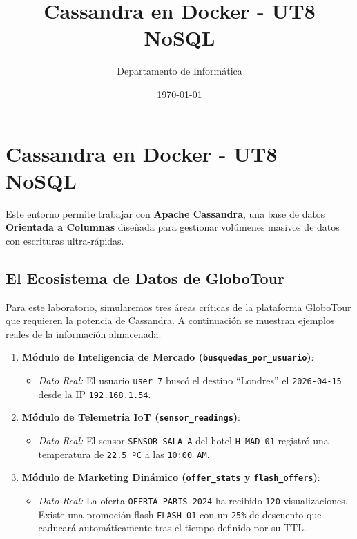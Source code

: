 \documentclass[12pt,a4paper]{article}
\title{\textbf{Cassandra en Docker - UT8 NoSQL}}
\author{Departamento de Informática}
\date{\today}
\begin{document}
\maketitle

\section{Cassandra en Docker - UT8 NoSQL}\label{cassandra-en-docker---ut8-nosql}

Este entorno permite trabajar con \textbf{Apache Cassandra}, una base de datos \textbf{Orientada a Columnas} diseñada para gestionar volúmenes masivos de datos con escrituras ultra-rápidas.

\subsection{El Ecosistema de Datos de GloboTour}\label{ecosistema}
Para este laboratorio, simularemos tres áreas críticas de la plataforma GloboTour que requieren la potencia de Cassandra. A continuación se muestran ejemplos reales de la información almacenada:

\begin{enumerate}
    \item \textbf{Módulo de Inteligencia de Mercado (\texttt{busquedas\_por\_usuario})}:
    \begin{itemize}
        \item \textit{Dato Real:} El usuario \texttt{user\_7} buscó el destino \enquote{Londres} el \texttt{2026-04-15} desde la IP \texttt{192.168.1.54}.
    \end{itemize}
    \item \textbf{Módulo de Telemetría IoT (\texttt{sensor\_readings})}: 
    \begin{itemize}
        \item \textit{Dato Real:} El sensor \texttt{SENSOR-SALA-A} del hotel \texttt{H-MAD-01} registró una temperatura de \texttt{22.5 ºC} a las \texttt{10:00 AM}.
    \end{itemize}
    \item \textbf{Módulo de Marketing Dinámico (\texttt{offer\_stats} y \texttt{flash\_offers})}: 
    \begin{itemize}
        \item \textit{Dato Real:} La oferta \texttt{OFERTA-PARIS-2024} ha recibido \texttt{120} visualizaciones. Existe una promoción flash \texttt{FLASH-01} con un \texttt{25\%} de descuento que caducará automáticamente tras el tiempo definido por su TTL.
    \end{itemize}
\end{enumerate}
\end{document}
